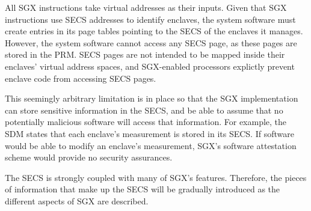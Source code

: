 
All SGX instructions take virtual addresses as their inputs. Given that SGX
instructions use SECS addresses to identify enclaves, the system software must
create entries in its page tables pointing to the SECS of the enclaves it
manages. However, the system software cannot access any SECS page, as these
pages are stored in the PRM. SECS pages are not intended to be mapped inside
their enclaves' virtual address spaces, and SGX-enabled processors explictly
prevent enclave code from accessing SECS pages.


This seemingly arbitrary limitation is in place so that the SGX implementation
can store sensitive information in the SECS, and be able to assume that no
potentially malicious software will access that information. For example, the
SDM states that each enclave's measurement is stored in its SECS. If software
would be able to modify an enclave's measurement, SGX's software attestation
scheme would provide no security assurances.

The SECS is strongly coupled with many of SGX's features. Therefore, the pieces
of information that make up the SECS will be gradually introduced as the
different aspects of SGX are described.
